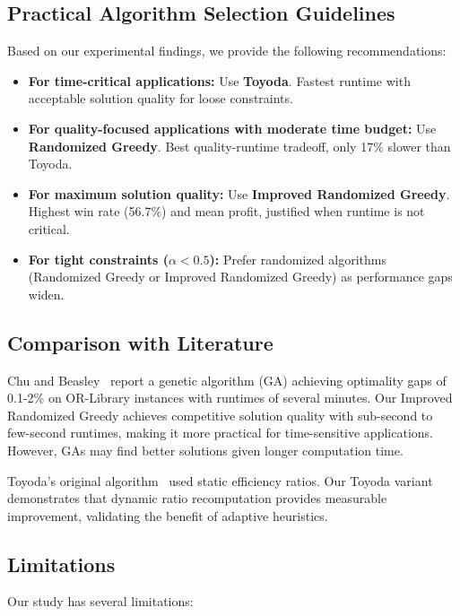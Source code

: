 \documentclass[12pt,a4paper]{article}
\begin{document}
\subsection{Practical Algorithm Selection Guidelines}

Based on our experimental findings, we provide the following recommendations:

\begin{itemize}
    \item \textbf{For time-critical applications:} Use \textbf{Toyoda}. Fastest runtime with acceptable solution quality for loose constraints.
    \item \textbf{For quality-focused applications with moderate time budget:} Use \textbf{Randomized Greedy}. Best quality-runtime tradeoff, only 17\% slower than Toyoda.
    \item \textbf{For maximum solution quality:} Use \textbf{Improved Randomized Greedy}. Highest win rate (56.7\%) and mean profit, justified when runtime is not critical.
    \item \textbf{For tight constraints ($\alpha < 0.5$):} Prefer randomized algorithms (Randomized Greedy or Improved Randomized Greedy) as performance gaps widen.
\end{itemize}

\subsection{Comparison with Literature}

Chu and Beasley~\cite{chu1998genetic} report a genetic algorithm (GA) achieving optimality gaps of 0.1-2\% on OR-Library instances with runtimes of several minutes. Our Improved Randomized Greedy achieves competitive solution quality with sub-second to few-second runtimes, making it more practical for time-sensitive applications. However, GAs may find better solutions given longer computation time.

Toyoda's original algorithm~\cite{toyoda1975simplified} used static efficiency ratios. Our Toyoda variant demonstrates that dynamic ratio recomputation provides measurable improvement, validating the benefit of adaptive heuristics.

\subsection{Limitations}

Our study has several limitations:
\end{document}
